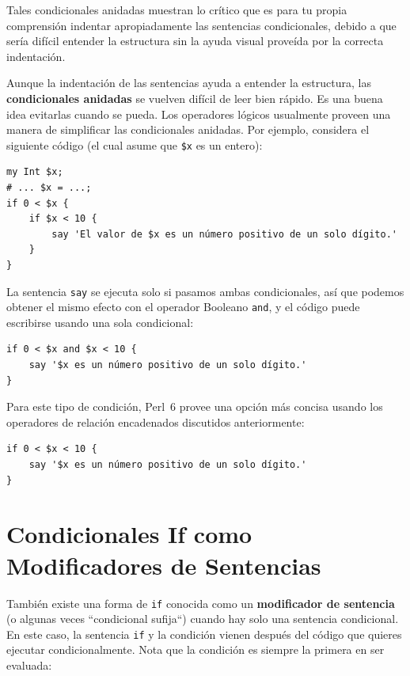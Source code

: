 Tales condicionales anidadas muestran lo crítico que es 
para tu propia comprensión indentar apropiadamente las
sentencias condicionales, debido a que sería difícil 
entender la estructura sin la ayuda visual
proveída por la correcta indentación.

Aunque la indentación de las sentencias ayuda
a entender la estructura, las {\bf condicionales anidadas}
se vuelven difícil de leer bien rápido. Es una buena
idea evitarlas cuando se pueda. Los operadores lógicos
usualmente proveen una manera de simplificar las
condicionales anidadas. Por ejemplo, considera
el siguiente código (el cual asume que \verb|$x| es
un entero):

\begin{verbatim}
my Int $x;
# ... $x = ...;
if 0 < $x {
    if $x < 10 {
        say 'El valor de $x es un número positivo de un solo dígito.'
    }
}
\end{verbatim}
%
La sentencia {\tt say} se ejecuta solo si pasamos ambas condicionales,
así que podemos obtener el mismo efecto con el operador Booleano {\tt and},
y el código puede escribirse usando una sola condicional:

\begin{verbatim}
if 0 < $x and $x < 10 {
    say '$x es un número positivo de un solo dígito.'
}
\end{verbatim}

Para este tipo de condición, Perl~6 provee una opción más concisa
usando los operadores de relación encadenados discutidos 
anteriormente:

\begin{verbatim}
if 0 < $x < 10 {
    say '$x es un número positivo de un solo dígito.'
}
\end{verbatim}

\section{Condicionales If como Modificadores de Sentencias}
 
 

También existe una forma de {\tt if} conocida como un
{\bf modificador de sentencia} (o algunas veces ``condicional sufija``)
cuando hay solo una sentencia condicional. En este caso, 
la sentencia {\tt if} y la condición vienen después del 
código que quieres ejecutar condicionalmente. Nota que la 
condición es siempre la primera en ser evaluada:

